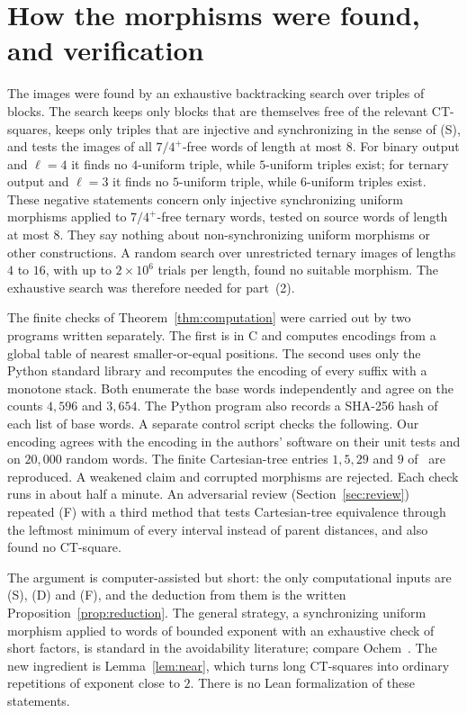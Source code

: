 \documentclass[11pt]{amsart}
\theoremstyle{definition}
\theoremstyle{remark}
\begin{document}
\section{How the morphisms were found, and verification}\label{sec:search}

The images were found by an exhaustive backtracking search over triples of blocks. The search keeps only blocks that are themselves free of the relevant CT-squares, keeps only triples that are injective and synchronizing in the sense of (S), and tests the images of all $7/4^+$-free words of length at most $8$. For binary output and $\ell=4$ it finds no $4$-uniform triple, while $5$-uniform triples exist; for ternary output and $\ell=3$ it finds no $5$-uniform triple, while $6$-uniform triples exist. These negative statements concern only injective synchronizing uniform morphisms applied to $7/4^+$-free ternary words, tested on source words of length at most $8$. They say nothing about non-synchronizing uniform morphisms or other constructions. A random search over unrestricted ternary images of lengths $4$ to $16$, with up to $2\times10^6$ trials per length, found no suitable morphism. The exhaustive search was therefore needed for part~(2).

The finite checks of Theorem~\ref{thm:computation} were carried out by two programs written separately. The first is in C and computes encodings from a global table of nearest smaller-or-equal positions. The second uses only the Python standard library and recomputes the encoding of every suffix with a monotone stack. Both enumerate the base words independently and agree on the counts $4{,}596$ and $3{,}654$. The Python program also records a SHA-256 hash of each list of base words. A separate control script checks the following. Our encoding agrees with the encoding in the authors' software on their unit tests and on $20{,}000$ random words. The finite Cartesian-tree entries $1,5,29$ and $9$ of~\cite[Table~1]{SMKI2026} are reproduced. A weakened claim and corrupted morphisms are rejected. Each check runs in about half a minute. An adversarial review (Section~\ref{sec:review}) repeated (F) with a third method that tests Cartesian-tree equivalence through the leftmost minimum of every interval instead of parent distances, and also found no CT-square.

The argument is computer-assisted but short: the only computational inputs are (S), (D) and (F), and the deduction from them is the written Proposition~\ref{prop:reduction}. The general strategy, a synchronizing uniform morphism applied to words of bounded exponent with an exhaustive check of short factors, is standard in the avoidability literature; compare Ochem~\cite{Ochem2006}. The new ingredient is Lemma~\ref{lem:near}, which turns long CT-squares into ordinary repetitions of exponent close to $2$. There is no Lean formalization of these statements.
\end{document}

